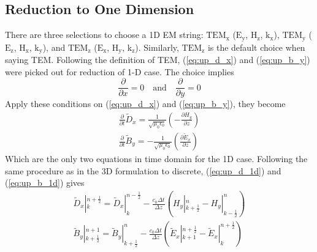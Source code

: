 \subsection{Reduction to One Dimension}
There are three selections to choose a 1D EM string: $\mathrm{TEM_x}$ ($\mathrm{E_{y}}$, $\mathrm{H_{z}}$,
$\mathrm{k_x}$), $\mathrm{TEM_y}$ ($\mathrm{E_z}$, $\mathrm{H_x}$, $\mathrm{k_y}$), and $\mathrm{TEM_z}$
($\mathrm{E_x}$, $\mathrm{H_y}$, $\mathrm{k_z}$). Similarly, $\mathrm{TEM_z}$ is the default choice when saying
TEM. Following the definition of TEM, (\ref{eq:up_d_x}) and (\ref{eq:up_b_y}) were picked out for reduction of 1-D
case. The choice implies
\begin{displaymath}
  \frac{\partial}{\partial x} = 0\quad \mathrm{and} \quad
  \frac{\partial}{\partial y} = 0
\end{displaymath}
Apply these conditions on (\ref{eq:up_d_x}) and (\ref{eq:up_b_y}), they become
\begin{gather}
  \frac{\partial}{\partial t}\widetilde{D}_x = \frac{1}{\sqrt{\mu_0\epsilon_0}}\left( - \frac{\partial H_y}{\partial z}\right)\label{eq:up_d_1d}\\
  \frac{\partial}{\partial t}\widetilde{B}_y =-\frac{1}{\sqrt{\mu_0\epsilon_0}}\left(\frac{\partial \widetilde{E}_x}{\partial z}\label{eq:up_b_1d} \right)
\end{gather}
Which are the only two equations in time domain for the 1D case. Following the same procedure as in the 3D formulation
to discrete, (\ref{eq:up_d_1d}) and (\ref{eq:up_b_1d}) gives
\begin{gather}
  \widetilde{D}_x|_k^{n+\frac{1}{2}} = \widetilde{D}_x|_k^{n-\frac{1}{2}} - \frac{c_0\Delta t}{\Delta z}\left( H_y|_{k+\frac{1}{2}}^n - H_y|_{k-\frac{1}{2}}^n \right)\\
  \widetilde{B}_y|_{k+\frac{1}{2}}^{n+1} = \widetilde{B}_y|_{k+\frac{1}{2}}^{n} - \frac{c_0\Delta t}{\Delta z}\left( \widetilde{E}_x|_{k+1}^{n+\frac{1}{2}} - \widetilde{E}_x|_{k}^{n+\frac{1}{2}} \right)
\end{gather}



